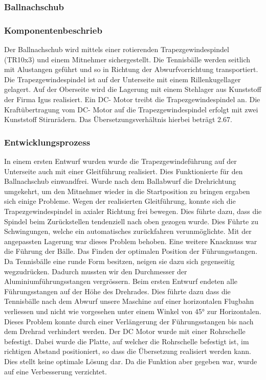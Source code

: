 \subsubsection{Ballnachschub}
\subsubsection*{Komponentenbeschrieb}
Der Ballnachschub wird mittels einer rotierenden Trapezgewindespindel (TR10x3) und einem Mitnehmer sichergestellt. Die Tennisbälle werden seitlich mit Alustangen geführt und so in Richtung der Abwurfvorrichtung transportiert. Die Trapezgewindespindel ist auf der Unterseite mit einem Rillenkugellager gelagert. Auf der Oberseite wird die Lagerung mit einem Stehlager aus Kunststoff der Firma Igus realisiert. Ein DC- Motor treibt die Trapezgewindespindel an. Die Kraftübertragung vom DC- Motor auf die Trapezgewindespindel erfolgt mit zwei Kunststoff Stirnrädern. Das Übersetzungsverhältnis hierbei beträgt 2.67. 

\subsubsection*{Entwicklungsprozess}
In einem ersten Entwurf wurden wurde die Trapezgewindeführung auf der Unterseite auch mit einer Gleitführung realisiert. Dies Funktionierte für den Ballnachschub einwandfrei. Wurde nach dem Ballabwurf die Drehrichtung umgekehrt, um den Mitnehmer wieder in die Startposition zu bringen ergaben sich einige Probleme. Wegen der realisierten Gleitführung, konnte sich die Trapezgewindespindel in axialer Richtung frei bewegen. Dies führte dazu, dass die Spindel beim Zurückstellen tendenziell nach oben gezogen wurde. Dies Führte zu Schwingungen, welche ein automatisches zurückfahren verunmöglichte. Mit der angepassten Lagerung war dieses Problem behoben. 
Eine weitere Knacknuss war die Führung der Bälle. Das Finden der optimalen Position der Führungsstangen. Da Tennisbälle eine runde Form besitzen, neigen sie dazu sich gegenseitig wegzudrücken. Dadurch mussten wir den Durchmesser der Aluminiumführungsstangen vergrössern. Beim ersten Entwurf endeten alle Führungsstangen auf der Höhe des Drehrades. Dies führte dazu dass die Tennisbälle nach dem Abwurf unsere Maschine auf einer horizontalen Flugbahn verliessen und nicht wie vorgesehen unter einem Winkel von 45° zur Horizontalen. Dieses Problem konnte durch einer Verlängerung der Führungsstangen bis nach dem Drehrad verhindert werden. 
Der DC Motor wurde mit einer Rohrschelle befestigt. Dabei wurde die Platte, auf welcher die Rohrschelle befestigt ist, im richtigen Abstand positioniert, so dass die Übersetzung realisiert werden kann. Dies stellt keine optimale Lösung dar. Da die Funktion aber gegeben war, wurde auf eine Verbesserung verzichtet. 
